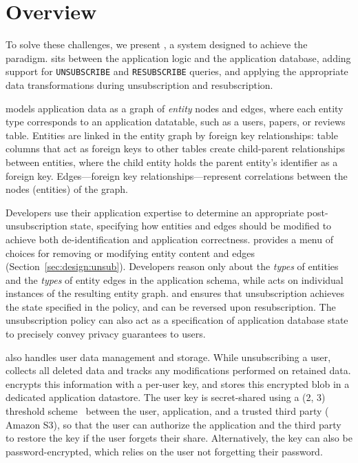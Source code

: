 \section{Overview}
To solve these challenges, we present \sys, a system designed to achieve the \name paradigm.
\sys sits between the application logic and the application database, adding support for
\texttt{UNSUBSCRIBE} and \texttt{RESUBSCRIBE} queries, and applying the appropriate data transformations
during unsubscription and resubscription.

\sys models application data as a graph of \emph{entity}
nodes and edges, where each entity type corresponds to an application datatable, such as a users,
papers, or reviews table.  Entities are linked in the entity graph by foreign key relationships:
table columns that act as foreign keys to other tables create child-parent relationships between
entities, where the child entity holds the parent entity's identifier as a foreign key. 
Edges---foreign key relationships---represent correlations between the nodes (entities) of the
graph.

Developers use their application expertise to determine an appropriate post-unsubscription state,
specifying how entities and edges should be modified to achieve both de-identification and application correctness. 
\sys provides a menu of choices for removing or modifying entity content and edges (Section~\ref{sec:design:unsub}).
Developers reason only about the \emph{types} of entities and the \emph{types} of entity edges
in the application schema, while \sys acts on individual instances of the resulting entity graph. \sys and
ensures that unsubscription achieves the state specified in the policy, and can be reversed upon
resubscription. 
The unsubscription policy can also act as a specification of
application database state to precisely convey privacy guarantees to users.

\sys also handles user data management and storage.
While unsubscribing a user, \sys collects all deleted data and tracks any modifications performed
on retained data. \sys encrypts this information with a per-user key, and stores this encrypted
blob in a dedicated application datastore. The user key is secret-shared using a (2, 3)
threshold scheme~\cite{secretsharing} between the user, application, and a trusted third party (\eg
Amazon S3), so that the user can authorize the application and the third party to restore the key if
the user forgets their share. Alternatively, the key can also be password-encrypted, which relies
on the user not forgetting their password.

